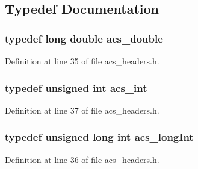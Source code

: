\subsection{Typedef Documentation}
\hypertarget{a00024_ab776853a005fcbf56af0424a2a4dd607}{
\subsubsection[{acs\-\_\-double}]{\setlength{\rightskip}{0pt plus 5cm}typedef long double {\bf acs\-\_\-double}}}\label{a00024_ab776853a005fcbf56af0424a2a4dd607}


Definition at line 35 of file acs\-\_\-headers.\-h.

\hypertarget{a00024_a8d277355641a098190360234e2ebde35}{
\subsubsection[{acs\-\_\-int}]{\setlength{\rightskip}{0pt plus 5cm}typedef unsigned int {\bf acs\-\_\-int}}}\label{a00024_a8d277355641a098190360234e2ebde35}


Definition at line 37 of file acs\-\_\-headers.\-h.

\hypertarget{a00024_a19319d75f02db4308bc5c0026d98cd85}{
\subsubsection[{acs\-\_\-long\-Int}]{\setlength{\rightskip}{0pt plus 5cm}typedef unsigned long int {\bf acs\-\_\-long\-Int}}}\label{a00024_a19319d75f02db4308bc5c0026d98cd85}


Definition at line 36 of file acs\-\_\-headers.\-h.


